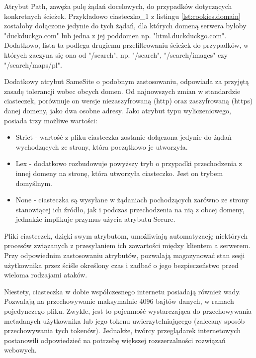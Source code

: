 Atrybut Path, zawęża pulę żądań docelowych, do przypadków dotyczących konkretnych ścieżek. Przykładowo ciasteczko\_1 z listingu \ref{lst:cookies.domain} zostałoby dołączone jedynie do tych żądań, dla których domeną serwera byłoby "duckduckgo.com" lub jedna z jej poddomen np. "html.duckduckgo.com". Dodatkowo, lista ta podlega drugiemu przefiltrowaniu ścieżek do przypadków, w których zaczyna się ona od "/search", np. "/search", "/search/images" czy "/search/maps/pl".

Dodatkowy atrybut SameSite o podobnym zastosowaniu, odpowiada za przyjętą zasadę tolerancji wobec obcych domen. Od najnowszych zmian w standardzie ciasteczek, porównuje on wersje niezaszyfrowaną (http) oraz zaszyfrowaną (https) danej domeny, jako dwa osobne adresy. Jako atrybut typu wyliczeniowego, posiada trzy możliwe wartości:

\begin{itemize}
    \item Strict - wartość z pliku ciasteczka zostanie dołączona jedynie do żądań wychodzących ze strony, która początkowo je utworzyła.
    \item Lex - dodatkowo rozbudowuje powyższy tryb o przypadki przechodzenia z innej domeny na stronę, która utworzyła ciasteczko. Jest on trybem domyślnym.
    \item None - ciasteczka są wysyłane w żądaniach pochodzących zarówno ze strony stanowiącej ich źródło, jak i podczas przechodzenia na nią z obcej domeny, jednakże implikuje przymus użycia atrybutu Secure.
\end{itemize}


Pliki ciasteczek, dzięki swym atrybutom, umożliwiają automatyzację niektórych procesów związanych z przesyłaniem ich zawartości między klientem a serwerem. Przy odpowiednim zastosowaniu atrybutów, pozwalają magazynować stan sesji użytkownika przez ściśle określony czas i zadbać o jego bezpieczeństwo przed wieloma rodzajami ataków. 

Niestety, ciasteczka w dobie współczesnego internetu posiadają również wady. Pozwalają na przechowywanie maksymalnie 4096 bajtów danych, w ramach pojedynczego pliku. Zwykle, jest to pojemność wystarczająca do przechowywania metadanych użytkownika lub jego tokenu uwierzytelniającego (zalecany sposób przechowywania tych tokenów). Jednakże, twórcy przeglądarek internetowych postanowili odpowiedzieć na potrzebę większej rozszerzalności rozwiązań webowych.

